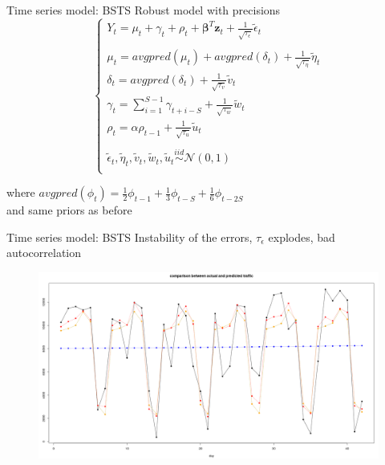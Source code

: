 \documentclass{beamer}
\begin{document}
\begin{frame}{Time series model: BSTS}
\alert{Robust model} with precisions
\begin{equation}
\begin{cases}
Y_t = \mu_t + \gamma_t + \rho_t + \boldsymbol{\beta}^T\mathbf{z}_t + \frac{1}{\sqrt{\tau_\epsilon}}\tilde{\epsilon}_t\\
\\
\mu_t = avgpred(\mu_t) + avgpred(\delta_t) +\frac{1}{\sqrt{\tau_\eta}}\tilde{\eta}_t\\
\delta_t = avgpred(\delta_t) + \frac{1}{\sqrt{\tau_v}}\tilde{v}_t\\
\gamma_t = \sum_{i=1}^{S-1}\gamma_{t+i-S} + \frac{1}{\sqrt{\tau_w}}\tilde{w}_t\\
\rho_t = \alpha\rho_{t-1} + \frac{1}{\sqrt{\tau_u}}\tilde{u}_t\\
\\
\tilde{\epsilon}_t, \tilde{\eta}_t, \tilde{v}_t, \tilde{w}_t, \tilde{u}_t \overset{iid}{\sim} \mathcal{N}(0,1)\\
\end{cases}
\end{equation}

where  $ avgpred(\phi_t) =\frac{1}{2}\phi_{t-1} + \frac{1}{3}\phi_{t-S} + \frac{1}{6} \phi_{t-2S}$\\
and same priors as before
\end{frame}

\begin{frame}{Time series model: BSTS}
\alert{Instability} of the errors, $ \tau_\epsilon $ explodes, bad autocorrelation
\begin{figure}[H]
	\centering
	\includegraphics[width=1\linewidth]{pictures/erratic.png} 
	\label{fig1}
\end{figure}

\end{frame}
\end{document}
